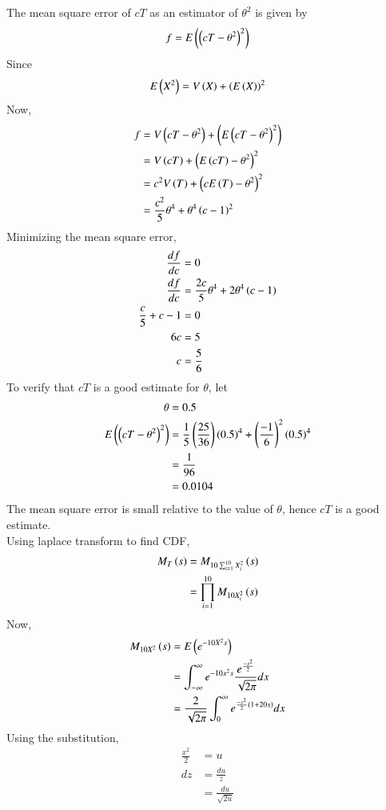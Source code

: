 \documentclass[journal,12pt,onecolumn]{IEEEtran}
\theoremstyle{remark}
\begin{document}
The mean square error of $cT$ as an estimator of $\theta^2$ is given by
\begin{align}
	f = E\left(\left(cT - \theta^2\right)^2\right)
\end{align}
Since
\begin{align}
	E\left(X^2\right) = V\left(X\right) + \left(E\left(X\right)\right)^2
\end{align}
Now,
\begin{align}
	f &= V\left(cT - \theta^2\right) + \left(E\left(cT - \theta^2\right)^2\right)\\
	&= V\left(cT\right) + \left(E\left(cT\right) - \theta^2\right)^2\\
	&= c^2V\left(T\right) + \left(cE\left(T\right) - \theta^2\right)^2\\
	&= \frac{c^2}{5}\theta^4 + \theta^4\left(c-1\right)^2
\end{align}
Minimizing the mean square error,
\begin{align}
	\frac{df}{dc} &= 0\\
	\frac{df}{dc} &= \frac{2c}{5}\theta^4 + 2\theta^4\left(c-1\right)\\
	\frac{c}{5} + c - 1 &= 0\\
	6c &= 5\\
	c &= \frac{5}{6}
\end{align}
To verify that $cT$ is a good estimate for $\theta$, let
\begin{align}
	\theta &= 0.5\\
	E\left(\left(cT - \theta^2\right)^2\right) &= \frac{1}{5}\left(\frac{25}{36}\right)\left(0.5\right)^4 + \left(\frac{-1}{6}\right)^2\left(0.5\right)^4\\
	&= \frac{1}{96}\\
	&= 0.0104
\end{align}
The mean square error is small relative to the value of $\theta$, hence $cT$ is a good estimate.
\\
Using laplace transform to find CDF,
\begin{align}
	M_T\left(s\right) &= M_{10\sum^{10}_{i=1}{X^2_i}}\left(s\right)\\
	&= \prod^{10}_{i=1}{M_{10X_i^2}\left(s\right)}
\end{align}
Now,
\begin{align}
	M_{10X^2}\left(s\right) &= E\left(e^{-10X^2s}\right)\\
	&= \int^{\infty}_{-\infty}{e^{-10x^2s}\frac{e^{\frac{-x^2}{2}}}{\sqrt{2\pi}}dx}\\
	&= \frac{2}{\sqrt{2\pi}}\int^{\infty}_{0}{e^{\frac{-x^2}{2}\left(1 + 20s\right)}dx}
\end{align}
Using the substitution,
\begin{align}
	\frac{x^2}{2} &= u\\
	dz &= \frac{du}{z}\\
	&= \frac{du}{\sqrt{2u}}
\end{align}
\end{document}

